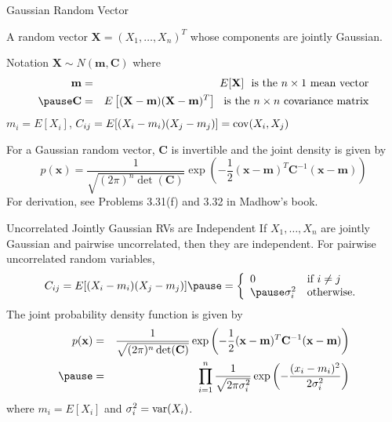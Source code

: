 \documentclass[t]{beamer}
\newcommand{\cov}{\operatornamewithlimits{cov}}
\newcommand{\var}{\operatornamewithlimits{var}}
\begin{document}
\begin{frame}{Gaussian Random Vector}
  \footnotesize
  \pause
  \begin{definition}
  A random vector $\mathbf{X} = (X_1,  \ldots,  X_n)^T$ whose components are jointly Gaussian.
  \end{definition}
  \pause
  \begin{block}{Notation}
  $\mathbf{X} \sim N(\mathbf{m},\mathbf{C})$ where \pause
  \begin{eqnarray*}
  \mathbf{m} & = & E[\mathbf{X}] \ \ \text{is the $n \times 1$ mean vector} \\ \pause
  \mathbf{C} & = & E\left[ (\mathbf{X}-\mathbf{m})(\mathbf{X}-\mathbf{m})^T\right] \ \ \text{is the $n \times n$ covariance matrix} 
  \end{eqnarray*}
  \pause $m_i = E[X_i]$, \pause $C_{ij} = E[(X_i-m_i)(X_j -m_j)] = \cov(X_i, X_j)$
  \end{block}
  \pause
  \begin{definition}
    For a Gaussian random vector, $\mathbf{C}$ is invertible and the joint density is given by
    \begin{equation*}
      p(\mathbf{x}) = \frac{1}{\sqrt{(2\pi)^n\det(\mathbf{C})}} \exp\left(-\frac{1}{2} (\mathbf{x}-\mathbf{m})^T\mathbf{C}^{-1}(\mathbf{x}-\mathbf{m})\right)
    \end{equation*}
  \pause For derivation, see Problems 3.31(f) and 3.32 in Madhow's book.
  \end{definition}
  \normalsize
\end{frame}

\begin{frame}{Uncorrelated Jointly Gaussian RVs are Independent}
  \footnotesize
  \pause
  If $X_1,\ldots,X_n$ are jointly Gaussian and pairwise uncorrelated, then they are independent.
  \pause
  For pairwise uncorrelated random variables,
  \begin{eqnarray*}
    C_{ij} =  E[(X_i-m_i)(X_j -m_j)]\pause  = \left\{ \begin{array}{ll}
                                                0 & \text{if $i \neq j$} \\ \pause
                                                \sigma_i^2 & \text{otherwise.}
                                               \end{array}
                                              \right.
  \end{eqnarray*}
  \pause The joint probability density function is given by
  \begin{eqnarray*}
    p(\mathbf{x}) & = & \frac{1}{\sqrt{(2\pi)^n\det(\mathbf{C})}} \exp\left(-\frac{1}{2} (\mathbf{x}-\mathbf{m})^T\mathbf{C}^{-1}(\mathbf{x}-\mathbf{m})\right) \\
                  \pause
                  & = &  \prod_{i=1}^n \frac{1}{\sqrt{2\pi\sigma_i^2}} \exp\left(-\frac{(x_i-m_i)^2}{2\sigma_i^2}\right)
  \end{eqnarray*}
  where $m_i = E[X_i]$ and $\sigma_i^2 = \var(X_i)$.
  \normalsize
\end{frame}
\end{document}

